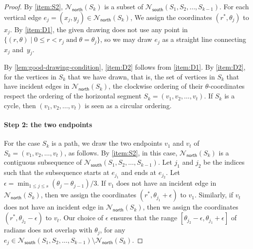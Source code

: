 \documentclass{theoretics}
\newcommand{\Nnorth}{\mathcal{N}_\mathsf{north}}
\newcommand{\Nsouth}{\mathcal{N}_\mathsf{south}}
\begin{document}
\begin{proof}
By \ref{item:S2}, $\Nnorth(S_k)$ is a subset of $\Nsouth(S_1, S_2, \ldots, S_{k-1})$. 
For each vertical edge $e_j = (x_j,y_j) \in \Nnorth(S_k)$, We assign the coordinates $(r^\ast, \theta_j)$ to $x_j$. By \ref{item:D1}, the given drawing does not use any point in $\{ (r,\theta) \mid 0\leq r < r_j \; \text{and} \; \theta = \theta_j\}$, so we may draw $e_j$ as a straight line connecting $x_j$ and~$y_j$. 


By \cref{lem:good-drawing-condition}, \ref{item:D2} follows from \ref{item:D1}. By \ref{item:D2}, for the vertices in $S_k$ that we have drawn, that is, the set of vertices in $S_k$ that have incident edges in $\Nnorth(S_k)$, the clockwise ordering of their $\theta$-coordinates respect the ordering of the horizontal segment $S_k = (v_1, v_2, \ldots, v_t)$. If $S_k$ is a cycle, then $(v_1, v_2, \ldots, v_t)$ is seen as a circular ordering.

\paragraph{Step 2: the two endpoints} For the case $S_k$ is a path, we draw the two endpoints $v_1$ and $v_t$ of $S_k = (v_1, v_2, \ldots, v_t)$, as follows. By \ref{item:S2}, in this case, $\Nnorth(S_k)$ is a contiguous subsequence of $\Nsouth(S_1, S_2, \ldots, S_{k-1})$. Let $j_1$ and $j_2$ be the indices such that the subsequence starts at $e_{j_1}$ and ends at $e_{j_2}$. Let $\epsilon = \min_{1 \leq j \leq s} (\theta_j - \theta_{j-1})/3$.
If $v_1$ does not have an incident edge in $\Nnorth(S_k)$, then we assign the coordinates $\left(r^\ast, \theta_{j_1}+\epsilon \right)$ to $v_1$.
Similarly, if $v_t$ does not have an incident edge in $\Nnorth(S_k)$, then we assign the coordinates $\left(r^\ast, \theta_{j_2}-\epsilon \right)$ to $v_t$.
Our choice of $\epsilon$ ensures that the range $[\theta_{j_2}-\epsilon, \theta_{j_1}+\epsilon]$ of radians does not overlap with  $\theta_j$, for any $e_j \in \Nsouth(S_1, S_2, \ldots, S_{k-1}) \setminus \Nnorth(S_k)$.


\end{proof}
\end{document}
